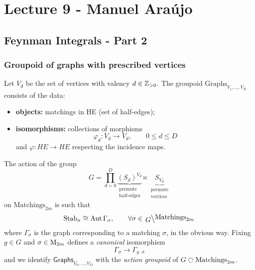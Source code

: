 \chapter{Lecture 9 - Manuel Araújo}

\section{Feynman Integrals - Part 2}

\subsection{Groupoid of graphs with prescribed vertices}

Let $V_d$ be the set of vertices with valency $d \in \mathbb{Z}_{>0}$.
The groupoid $\mathrm{Graphs}_{V_1, \dots, V_D}$ consists of the data:
\begin{itemize}
  \item \textbf{objects:} matchings in HE (set of half-edges);
  \item \textbf{isomorphisms:} collections of morphisms
    \begin{equation*}
      \varphi_d \colon V_d \longrightarrow V_d, \qquad 0 \leq d \leq D
    \end{equation*}
    and $\varphi \colon HE \to HE$ respecting the incidence maps.
\end{itemize}

The action of the group
\begin{equation*}
  G = \prod_{d = 0}^D
  \underbrace{(S_d)^{V_d}}_{\substack{
      \text{permute} \\ \text{half-edges}
  }} \ltimes 
  \underbrace{S_{V_d}}_{\substack{
      \text{permute} \\ \text{vertices}
  }}
\end{equation*}
on $\text{Matchings}_{2m}$ is such that
\begin{equation*}
  \Stab_\sigma \cong \Aut \Gamma_\sigma, \qquad \forall \sigma \in \lbigslant{G}{\text{Matchings}_{2m}}
\end{equation*}
where $\Gamma_\sigma$ is the graph corresponding to a matching $\sigma$, in the obvious way.
Fixing $g \in G$ and $\sigma \in \mathrm{M}_{2m}$ defines a \textit{canonical} isomorphism
\begin{equation*}
  \Gamma_\sigma \longrightarrow \Gamma_{g \cdot \sigma}
\end{equation*}
and we identify $\mathsf{Graphs}_{V_0, \dots, V_D}$ with the \textit{action groupoid} of $G \acts \text{Matchings}_{2m}$.

